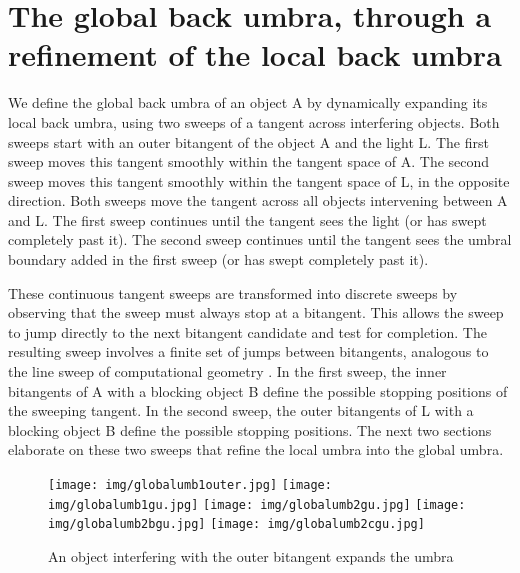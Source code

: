 \documentclass[9pt,twocolumn]{article}
\begin{document}

\clearpage

\section{The global back umbra, through a refinement of the local back umbra}

We define the global back umbra of an object A by dynamically expanding its local back umbra,
using two sweeps of a tangent across interfering objects.
Both sweeps start with an outer bitangent of the object A and the light L.
The first sweep moves this tangent smoothly within the tangent space of A.
The second sweep moves this tangent smoothly within the tangent space of L,
in the opposite direction.
Both sweeps move the tangent across all objects intervening between A and L.
The first sweep continues until the tangent sees the light (or has swept
completely past it).
The second sweep continues until the tangent sees the umbral boundary added
in the first sweep (or has swept completely past it).

These continuous tangent sweeps are transformed into discrete sweeps
by observing that the sweep must always stop at a bitangent.
This allows the sweep to jump directly to the next bitangent candidate
and test for completion.
The resulting sweep involves a finite set of jumps between bitangents,
analogous to the line sweep of computational geometry \cite{preparataShamos}.
In the first sweep,
the inner bitangents of A with a blocking object B define the possible
stopping positions of the sweeping tangent.
In the second sweep, the outer bitangents of L with a blocking object B
define the possible stopping positions.
The next two sections elaborate on these two sweeps that refine
the local umbra into the global umbra.

\begin{figure}
\begin{center}
\texttt{[image: img/globalumb1outer.jpg]}
\texttt{[image: img/globalumb1gu.jpg]}
\texttt{[image: img/globalumb2gu.jpg]}
\texttt{[image: img/globalumb2bgu.jpg]}
\texttt{[image: img/globalumb2cgu.jpg]}
\end{center}
\caption{An object interfering with the outer bitangent expands the umbra}
\label{fig:globalumb2}
\end{figure}
\end{document}
